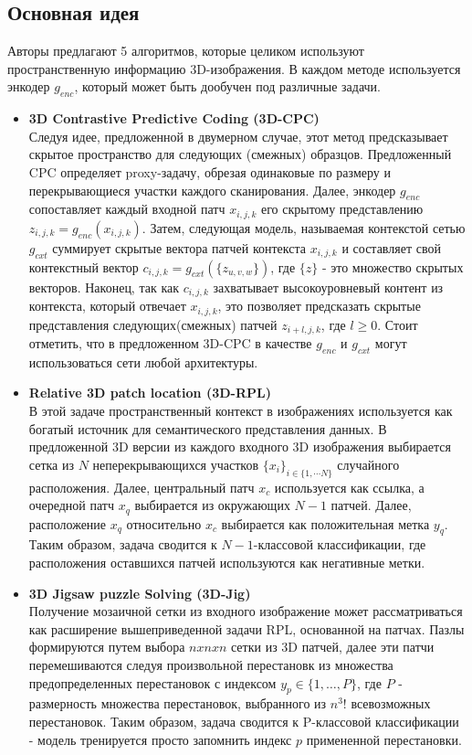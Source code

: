 \subsection*{Основная идея}
Авторы предлагают 5 алгоритмов, которые целиком используют пространственную информацию
3D-изображения. В каждом методе используется энкодер \(g_{enc}\), который 
может быть дообучен под различные задачи.
\begin{itemize}
    \item \textbf{3D Contrastive Predictive Coding (3D-CPC)} \\
    Следуя идее, предложенной в двумерном случае, этот метод предсказывает скрытое 
    пространство для следующих (смежных) образцов. Предложенный CPC определяет 
    proxy-задачу, обрезая одинаковые по размеру и перекрывающиеся участки каждого 
    сканирования. Далее, энкодер \(g_{enc}\) сопоставляет каждый входной патч 
    \(x_{i,j,k}\) его скрытому представлению \(z_{i,j,k}= g_{enc}(x_{i,j,k})\). Затем, 
    следующая модель, называемая контекстой сетью \(g_{cxt}\) суммирует скрытые вектора патчей
    контекста \(x_{i,j,k}\) и составляет свой контекстный вектор 
    \(c_{i,j,k}=g_{cxt}(\{z_{u,v,w}\})\), где \(\{z\}\) - это множество скрытых векторов.
    Наконец, так как \(c_{i,j,k}\) захватывает высокоуровневый контент из контекста, который 
    отвечает \(x_{i,j,k}\), это позволяет предсказать скрытые представления следующих(смежных)
    патчей \(z_{i+l,j,k}\), где \(l\geq 0\). Стоит отметить, что в предложенном 3D-CPC
    в качестве \(g_{enc}\) и \(g_{cxt}\) могут использоваться сети любой архитектуры.
    \item \textbf{Relative 3D patch location (3D-RPL)} \\
    В этой задаче пространственный контекст в изображениях используется 
    как богатый источник для семантического представления данных. В предложенной 
    3D версии из каждого входного 3D изображения выбирается сетка из \(N\)
    неперекрывающихся участков \(\{x_{i}\}_{i\in \{1, \cdots N\}}\) случайного расположения. 
    Далее, центральный патч \(x_c\) используется как ссылка, а очередной патч \(x_q\)
    выбирается из окружающих \(N-1\) патчей. Далее, расположение \(x_q\) относительно \(x_c\)
    выбирается как положительная метка \(y_q\). Таким образом, задача сводится к \(N-1\)-классовой 
    классификации, где расположения оставшихся патчей используются как негативные метки.
    \item \textbf{3D Jigsaw puzzle Solving (3D-Jig)} \\
    Получение мозаичной сетки из входного изображение может рассматриваться как 
    расширение вышеприведенной задачи RPL, основанной на патчах. Пазлы формируются
    путем выбора \(nxnxn\) сетки из 3D патчей, далее эти патчи перемешиваются следуя 
    произвольной перестановк из множества предопределенных перестановок с индексом 
    \(y_{p}\in \{1,\dots , P\}\), где \(P\) - размерность множества перестановок, выбранного
    из \(n^{3}!\) всевозможных перестановок. Таким образом, задача сводится к P-классовой 
    классификации - модель тренируется просто запомнить индекс \(p\) примененной перестановки.


\end{itemize}
